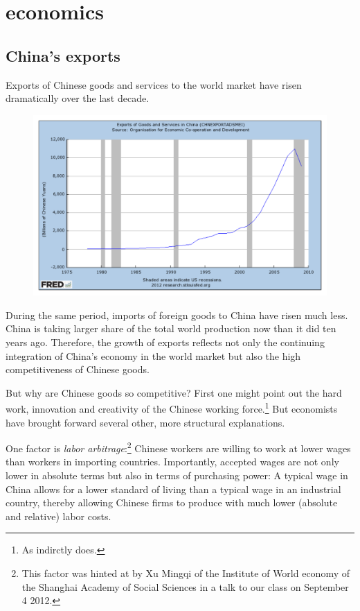 \documentclass[11pt]{article}
\begin{document}
\setlength{\parindent}{0pt}
\section{economics}

\subsection{China's exports}

Exports of Chinese goods and services to the world market have risen dramatically over the last decade. %
   
     \begin{figure}[h]
     \begin{center}
     \includegraphics[width=1\textwidth]{ExportsChinaFRED.pdf}
     \end{center}
     \end{figure}

During the same period, imports of foreign goods to China have risen much less. China is taking larger share of the total world production now than it did ten years ago. Therefore, the growth of exports reflects not only the continuing integration of China's economy in the world market but also the high competitiveness of Chinese goods. 

But why are Chinese goods so competitive? First one might point out the hard work, innovation and creativity of the Chinese working force.\footnote{As \cite[p. 18]{Yu2010} indirctly does.} But economists have brought forward several other, more structural explanations.

One factor is \emph{labor arbitrage}:\footnote{This factor was hinted at by Xu Mingqi of the Institute of World economy of the Shanghai Academy of Social Sciences in a talk to our class on September 4 2012.} Chinese workers are willing to work at lower wages than workers in importing countries. Importantly, accepted wages are not only lower in absolute terms but also in terms of purchasing power: A typical wage in China allows for a lower standard of living than a typical wage in an industrial country, thereby allowing Chinese firms to produce with much lower (absolute and relative) labor costs. 
\end{document}
